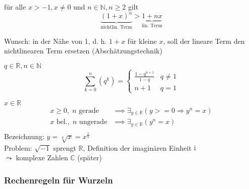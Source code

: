 \begin{proposition}
  für alle $x > -1, x \neq 0$ und $n \in \mathbb{N}, n \geq 2$ gilt
  \begin{equation*} \underbrace{(1+x)^n}_\text{nichtlin. Term} > \underbrace{1+nx}_\text{lin. Term} \end{equation*}
  \induction
\end{proposition}
%
Wunsch: in der Nähe von 1, d. h. $1+x$ für kleine $x$, soll der lineare Term den nichtlinearen Term ersetzen (Abschätzungstechnik)

\begin{theorem}\flush
 $q \in \mathbb{R}, n \in \mathbb{N}$
 \begin{equation*} \sum_{k=0}^n \left( q^k\right) = \begin{cases}\frac{1-q^{n+1}}{1-q} & q \neq 1 \\ n+1 & q = 1\end{cases} \end{equation*}
\end{theorem}

\induction

\begin{definition}[$n$-te Wurzel]\flush
 $x\in \mathbb{R}$
 \begin{align*}
  x \geq 0,\; n \text{ gerade} &\implies \exists_{y \in \mathbb{R}} \left( y >= 0 \Rightarrow y^n = x \right) \\
  x \text{ bel.},\; n \text{ ungerade} &\implies \exists_{y \in \mathbb{R}} \left( y^n = x \right) \\
 \end{align*}
Bezeichnung: $y = \sqrt[n]{x} = x^\frac 1 n$\\
Problem: $\sqrt{-1}$ sprengt $\mathbb{R}$, Definition der imaginären Einheit $\operatorname{i}$\\$\leadsto$ komplexe Zahlen $\mathbb{C}$ (später)
\end{definition}

\subsubsection*{Rechenregeln für Wurzeln}

